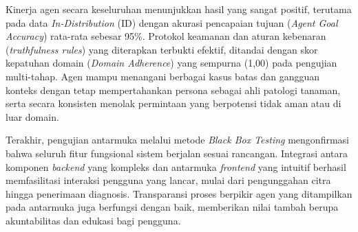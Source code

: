 Kinerja agen secara keseluruhan menunjukkan hasil yang sangat positif, terutama pada data \textit{In-Distribution} (ID) dengan akurasi pencapaian tujuan (\textit{Agent Goal Accuracy}) rata-rata sebesar 95\%. Protokol keamanan dan aturan kebenaran (\textit{truthfulness rules}) yang diterapkan terbukti efektif, ditandai dengan skor kepatuhan domain (\textit{Domain Adherence}) yang sempurna (1,00) pada pengujian multi-tahap. Agen mampu menangani berbagai kasus batas dan gangguan konteks dengan tetap mempertahankan persona sebagai ahli patologi tanaman, serta secara konsisten menolak permintaan yang berpotensi tidak aman atau di luar domain.

Terakhir, pengujian antarmuka melalui metode \textit{Black Box Testing} mengonfirmasi bahwa seluruh fitur fungsional sistem berjalan sesuai rancangan. Integrasi antara komponen \textit{backend} yang kompleks dan antarmuka \textit{frontend} yang intuitif berhasil memfasilitasi interaksi pengguna yang lancar, mulai dari pengunggahan citra hingga penerimaan diagnosis. Transparansi proses berpikir agen yang ditampilkan pada antarmuka juga berfungsi dengan baik, memberikan nilai tambah berupa akuntabilitas dan edukasi bagi pengguna.

